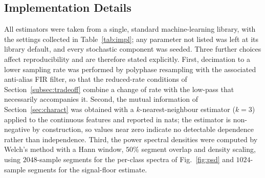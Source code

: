 \subsection{Implementation Details}
\label{subsec:impl}
All estimators were taken from a single, standard machine-learning library, with
the settings collected in Table~\ref{tab:impl}; any parameter not listed was left
at its library default, and every stochastic component was seeded. Three further
choices affect reproducibility and are therefore stated explicitly. First,
decimation to a lower sampling rate was performed by polyphase resampling with
the associated anti-alias FIR filter, so that the reduced-rate conditions of
Section~\ref{subsec:tradeoff} combine a change of rate with the low-pass that
necessarily accompanies it. Second, the mutual information of
Section~\ref{sec:charact} was obtained with a $k$-nearest-neighbour estimator
($k=3$) applied to the continuous features and reported in nats; the estimator is
non-negative by construction, so values near zero indicate no detectable
dependence rather than independence. Third, the power spectral densities were
computed by Welch's method with a Hann window, $50\%$ segment overlap and
density scaling, using $2048$-sample segments for the per-class spectra of
Fig.~\ref{fig:psd} and $1024$-sample segments for the signal-floor estimate.

